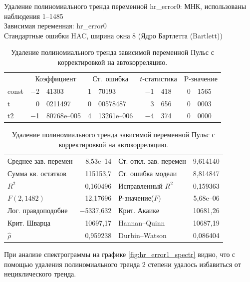 \documentclass[a4paper,12pt]{article}
\begin{document}
\begin{table}[H]
	\begin{center}
		
		Удаление полиномиального тренда переменной hr\_error0:
		МНК, использованы наблюдения 1--1485\\
		Зависимая переменная: hr\_error0\\
		Стандартные ошибки HAC, ширина окна 8 (Ядро Бартлетта (Bartlett))
		
		\vspace{1em}
		
		\begin{tabular}{lr@{,}lr@{,}lr@{,}lr@{,}l}
			&
			\multicolumn{2}{c}{Коэффициент} &
			\multicolumn{2}{c}{Ст.\ ошибка} &
			\multicolumn{2}{c}{$t$-статистика} &
			\multicolumn{2}{c}{P-значение} \\[1ex]
			const &			$-$2&41303 &			1&70193 &			$-$1&418 &			0&1565 \\
			t &			0&0211497 &			0&00578487 &			3&656 &			0&0003 \\
			t2 &			$-$1&80768\textrm{e--005} &			4&13261\textrm{e--006} &			$-$4&374 &			0&0000 \\
		\end{tabular}
		
		\vspace{1ex}
		\begin{tabular}{lrlr}
			Среднее зав. перемен &  8,53\textrm{e--14} & Ст. откл. зав. перемен &  9,614140 \\
			Сумма кв. остатков &  115153,7 & Ст. ошибка модели &  8,814847 \\
			$R^2$ &  0,160496 & Исправленный $R^2$ &  0,159363 \\
			$F(2, 1482)$ &  12,17696 & Р-значение($F$) &  5,68\textrm{e--06} \\
			Лог. правдоподобие & $-$5337,632 & Крит. Акаике &  10681,26 \\
			Крит. Шварца &  10697,17 & Hannan--Quinn &  10687,19 \\
			$\hat{\rho}$ &  0,959238 & Durbin--Watson &  0,086404 \\
		\end{tabular}
	\end{center}
\caption{Удаление полиномиального тренда зависимой переменной Пульс с корректировкой на автокорреляцию.}
\label{tab:table2}
\end{table}

При анализе спектрограммы на графике \ref{fig:hr_error1_spectr} видно, что с помощью удаления полиномиального тренда 2 степени удалось избавиться от нециклического тренда.
\end{document}
